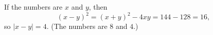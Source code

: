 If the numbers are $x$ and $y$, then
\[(x-y)^2=(x+y)^2-4xy=144-128=16,\]
so $|x-y|=\boxed{4}$. (The numbers are $8$ and $4$.)
